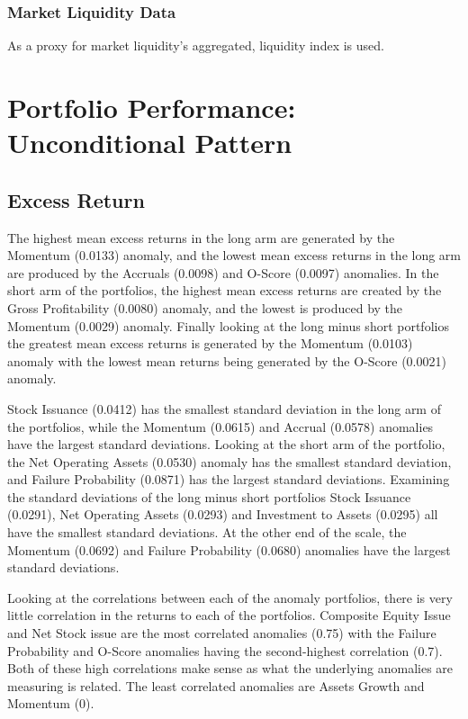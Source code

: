 \documentclass[a4paper,12pt]{article}                 %
\begin{document}
\subsubsection{Market Liquidity Data}
As a proxy for market liquidity\cite{pastor2003liquidity}'s aggregated, liquidity index is used. 


\section{Portfolio Performance: Unconditional Pattern}
\subsection{Excess Return }
The highest mean excess returns in the long arm are generated by the Momentum (0.0133) anomaly, and the lowest mean excess returns in the long arm are produced by the Accruals (0.0098) and O-Score (0.0097) anomalies. In the short arm of the portfolios, the highest mean excess returns are created by the Gross Profitability (0.0080) anomaly, and the lowest is produced by the Momentum (0.0029) anomaly. Finally looking at the long minus short portfolios the greatest mean excess returns is generated by the Momentum (0.0103) anomaly with the lowest mean returns being generated by the O-Score (0.0021) anomaly.

Stock Issuance (0.0412) has the smallest standard deviation in the long arm of the portfolios, while the Momentum (0.0615) and Accrual (0.0578) anomalies have the largest standard deviations. Looking at the short arm of the portfolio, the Net Operating Assets (0.0530) anomaly has the smallest standard deviation, and Failure Probability (0.0871) has the largest standard deviations. Examining the standard deviations of the long minus short portfolios Stock Issuance (0.0291), Net Operating Assets (0.0293) and Investment to Assets (0.0295) all have the smallest standard deviations. At the other end of the scale, the Momentum (0.0692) and Failure Probability (0.0680) anomalies have the largest standard deviations.

Looking at the correlations between each of the anomaly portfolios, there is very little correlation in the returns to each of the portfolios. Composite Equity Issue and Net Stock issue are the most correlated anomalies (0.75) with the Failure Probability and O-Score anomalies having the second-highest correlation (0.7). Both of these high correlations make sense as what the underlying anomalies are measuring is related. The least correlated anomalies are Assets Growth and Momentum (0).
\end{document}
